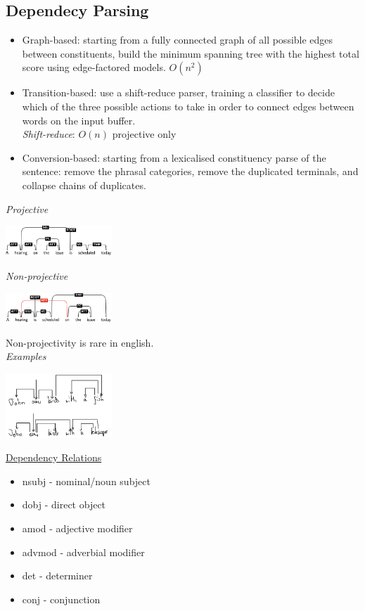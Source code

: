 \documentclass[8pt]{extarticle} %
\begin{document}
\begin{multicols*}{3}
\subsection*{Dependecy Parsing}
\begin{itemize}[label=\textbullet, labelsep=0.3em, leftmargin=0.5em, itemsep=0em]
\item Graph-based: starting from a fully connected graph of all possible edges between constituents, build the minimum spanning tree with the highest total score using edge-factored models. $O(n^2)$
\item Transition-based: use a shift-reduce parser, training a classifier to decide which of the three possible actions to take in order to connect edges between words on the input buffer.\\
\textit{Shift-reduce}: $O(n)$ projective only
\item Conversion-based: starting from a lexicalised constituency parse of the sentence: remove the phrasal categories, remove the duplicated terminals, and collapse chains of duplicates.
\end{itemize}

\textit{Projective}
\begin{center}
    \includegraphics[width=0.3\textwidth]{media/dependency-projective.png}
\end{center}
\textit{Non-projective}
\begin{center}
    \includegraphics[width=0.3\textwidth]{media/dependency-non-projecitve.png}
\end{center}
Non-projectivity is rare in english.\\
\textit{Examples}
\begin{center}
    \includegraphics[width=0.3\textwidth]{media/dependency-parse.png}
\end{center}
\underline{Dependency Relations}
\begin{itemize}[label=\textbullet, labelsep=0.3em, leftmargin=0.5em, itemsep=0em]
\item nsubj - nominal/noun subject
\item dobj - direct object
\item amod - adjective modifier
\item advmod - adverbial modifier
\item det - determiner
\item conj - conjunction
\end{itemize}


\end{multicols*}
\end{document}

